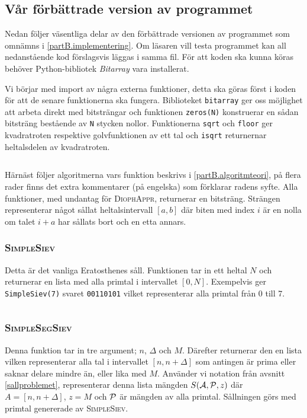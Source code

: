 
\newcommand{\code}[1]{\inputminted[frame=lines,fontsize=\footnotesize,linenos]{python}{code/#1.py}}

\subsection{Vår förbättrade version av programmet}
Nedan följer väsentliga delar av den förbättrade versionen av programmet som omnämns i \ref{partB.implementering}.
Om läsaren vill testa programmet kan all nedanstående kod förslagsvis läggas i samma fil. För att koden ska kunna köras behöver Python-bibliotek \textit{Bitarray} vara installerat.


Vi börjar med import av några externa funktioner, detta ska göras först i koden för att de senare funktionerna ska fungera.
Biblioteket \texttt{bitarray} ger oss möjlighet att arbeta direkt med bitsträngar och funktionen \texttt{zeros(N)} konstruerar en sådan bitsträng bestående av \texttt{N} stycken nollor.
Funktionerna \texttt{sqrt} och \texttt{floor} ger kvadratroten respektive golvfunktionen av ett tal 
och \texttt{isqrt} returnernar heltalsdelen av kvadratroten.
\code{imports}


Härnäst följer algoritmerna vars funktion beskrivs i \ref{partB.algoritmteori}, 
på flera rader finns det extra kommentarer (på engelska) som förklarar radens syfte.
Alla funktioner, med undantag för \textsc{DiophAppr}, returnerar en bitsträng. Strängen representerar något sållat heltalsintervall $[a,b]$ 
där biten med index $i$ är en nolla om talet $i+a$ har sållats bort och en etta annars.


\subsubsection*{\textsc{SimpleSiev}}
Detta är det vanliga Eratosthenes såll. Funktionen tar in ett heltal $N$ och returnerar en lista med alla primtal i intervallet $[0,N]$.
Exempelvis ger \texttt{SimpleSiev(7)} svaret \texttt{00110101} vilket representerar alla primtal från 0 till 7. 
\code{SimpleSiev} 


\subsubsection*{\textsc{SimpleSegSiev}}
Denna funktion tar in tre argument; $n$, $\Delta$ och $M$. Därefter returnerar den en lista vilken representerar alla tal i intervallet $[n, n+\Delta]$ som antingen är prima eller saknar delare mindre än, eller lika med $M$. Använder vi notation från avsnitt \ref{sallproblemet}, representerar denna lista mängden $\S{A}{P}{z}$ där $A=[n, n+\Delta]$, $z=M$ och $\P$ är mängden av alla primtal. Sållningen görs med primtal genererade av \textsc{SimpleSiev}.
\code{SimpleSegSiev} 


